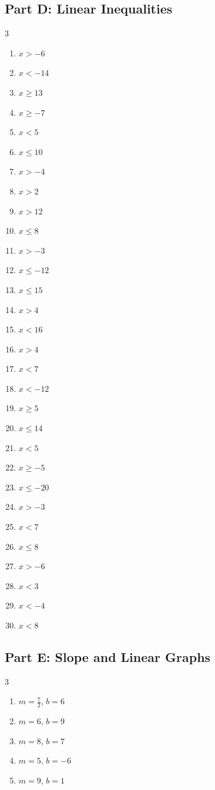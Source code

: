 \documentclass[11pt]{article}
\begin{document}
\subsection*{Part D: Linear Inequalities}
\begin{multicols}{3}
\begin{enumerate}
  \item $x > -6$
  \item $x < -14$
  \item $x \ge 13$
  \item $x \ge -7$
  \item $x < 5$
  \item $x \le 10$
  \item $x > -4$
  \item $x > 2$
  \item $x > 12$
  \item $x \le 8$
  \item $x > -3$
  \item $x \le -12$
  \item $x \le 15$
  \item $x > 4$
  \item $x < 16$
  \item $x > 4$
  \item $x < 7$
  \item $x < -12$
  \item $x \ge 5$
  \item $x \le 14$
  \item $x < 5$
  \item $x \ge -5$
  \item $x \le -20$
  \item $x > -3$
  \item $x < 7$
  \item $x \le 8$
  \item $x > -6$
  \item $x < 3$
  \item $x < -4$
  \item $x < 8$
\end{enumerate}
\end{multicols}
\subsection*{Part E: Slope and Linear Graphs}
\begin{multicols}{3}
\begin{enumerate}
  \item $m = \frac{7}{2}$, \quad $b = 6$
  \item $m = 6$, \quad $b = 9$
  \item $m = 8$, \quad $b = 7$
  \item $m = 5$, \quad $b = -6$
  \item $m = 9$, \quad $b = 1$
\end{enumerate}
\end{multicols}
\end{document}
